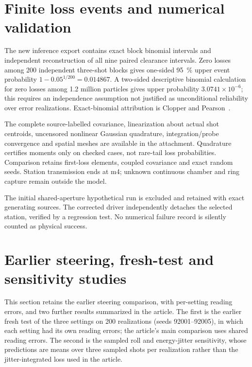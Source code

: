 \documentclass[10pt,a4paper]{article}
\begin{document}
\begin{table}[htbp]\centering
\caption{Spatial convergence of the refined low-beta setting. Integration remains
at 40 steps per magnet while the observation mesh changes. The reported peaks
are sampled maxima; the last column is the larger change in either plane
relative to the preceding mesh.}\label{tab:spatial-resolution}

\end{table}

\section{Finite loss events and numerical validation}
The new inference export contains exact block binomial intervals and independent
reconstruction of all nine paired clearance intervals. Zero losses among 200
independent three-shot blocks gives one-sided \SI{95}{\percent} upper event probability
$1-0.05^{1/200}=0.014867$. A two-sided descriptive binomial calculation for zero
losses among 1.2 million particles gives upper probability $3.0741\times10^{-6}$;
this requires an independence assumption not justified as unconditional reliability over error
realizations. Exact-binomial attribution is Clopper and Pearson~\cite{Clopper1934}.

The complete source-labelled covariance, linearization about actual shot
centroids, uncensored nonlinear Gaussian quadrature, integration/probe convergence
and spatial meshes are available in the attachment. Quadrature certifies moments
only on checked cases, not rare-tail loss probabilities. Comparison retains
first-loss elements, coupled covariance and exact random seeds. Station
transmission ends at m4; unknown continuous chamber and ring capture remain
outside the model.

The initial shared-aperture hypothetical run is excluded and retained with exact
generating sources. The corrected driver independently detaches the selected
station, verified by a regression test. No numerical failure record is silently
counted as physical success.

\section{Earlier steering, fresh-test and sensitivity studies}\label{sec:earlier-test}
This section retains the earlier steering comparison, with per-setting reading errors,
and two further results summarized in the article. The first is the earlier fresh test of the three settings on 200 realizations (seeds 92001--92005),
in which each setting had its own reading errors; the article's main comparison
uses shared reading errors. The second is the sampled roll and energy-jitter
sensitivity, whose predictions are means over three sampled shots per realization
rather than the jitter-integrated loss used in the article.
\end{document}
